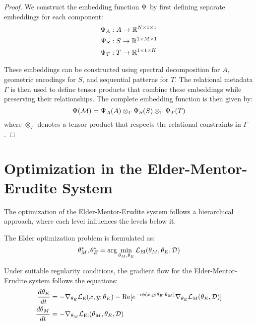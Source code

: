 \begin{proof}
We construct the embedding function $\Psi$ by first defining separate embeddings for each component:
\begin{align*}
\Psi_A &: A \rightarrow \mathbb{R}^{N \times 1 \times 1} \\
\Psi_S &: S \rightarrow \mathbb{R}^{1 \times M \times 1} \\
\Psi_T &: T \rightarrow \mathbb{R}^{1 \times 1 \times K} \\
\end{align*}

These embeddings can be constructed using spectral decomposition for $A$, geometric encodings for $S$, and sequential patterns for $T$. The relational metadata $\Gamma$ is then used to define tensor products that combine these embeddings while preserving their relationships. The complete embedding function is then given by:
\begin{equation}
\Psi(\mathcal{M}) = \Psi_A(A) \otimes_{\Gamma} \Psi_S(S) \otimes_{\Gamma} \Psi_T(T)
\end{equation}
where $\otimes_{\Gamma}$ denotes a tensor product that respects the relational constraints in $\Gamma$.
\end{proof}

\section{Optimization in the Elder-Mentor-Erudite System}

The optimization of the Elder-Mentor-Erudite system follows a hierarchical approach, where each level influences the levels below it.

\begin{definition}
The Elder optimization problem is formulated as:
\begin{equation}
\theta_M^*, \theta_E^* = \arg\min_{\theta_M, \theta_E} \mathcal{L}_{\text{El}}(\theta_M, \theta_E, \mathcal{D})
\end{equation}
\end{definition}

\begin{theorem}
Under suitable regularity conditions, the gradient flow for the Elder-Mentor-Erudite system follows the equations:
\begin{align}
\frac{d\theta_E}{dt} &= -\nabla_{\theta_E} \mathcal{L}_{\text{E}}(x, y; \theta_E) - \mathrm{Re}[e^{-i\phi(x,y;\theta_E,\theta_M)} \nabla_{\theta_E} \mathcal{L}_{\text{M}}(\theta_E, \mathcal{D})] \\
\frac{d\theta_M}{dt} &= -\nabla_{\theta_M} \mathcal{L}_{\text{El}}(\theta_M, \theta_E, \mathcal{D})
\end{align}
\end{theorem}

